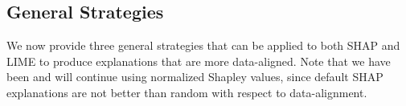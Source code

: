 \documentclass[mnsc,blindrev]{informs3}
\begin{document}
                

                
    \subsection{General Strategies}
        We now provide three general strategies that can be applied to both SHAP and LIME to produce explanations that are more data-aligned. Note that we have been and will continue using normalized Shapley values, since default SHAP explanations are not better than random with respect to data-alignment. %
\end{document}
